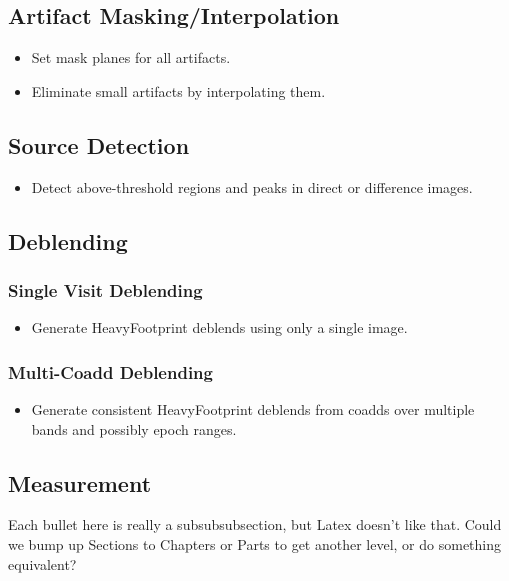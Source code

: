 \subsection{Artifact Masking/Interpolation}
\begin{itemize}
\item Set mask planes for all artifacts.
\item Eliminate small artifacts by interpolating them.
\end{itemize}

\subsection{Source Detection}
\begin{itemize}
\item Detect above-threshold regions and peaks in direct or difference images.
\end{itemize}

\subsection{Deblending}
\subsubsection{Single Visit Deblending}
\begin{itemize}
\item Generate HeavyFootprint deblends using only a single image.
\end{itemize}
\subsubsection{Multi-Coadd Deblending}
\begin{itemize}
\item Generate consistent HeavyFootprint deblends from coadds over multiple bands and possibly epoch ranges.
\end{itemize}

\subsection{Measurement}

\begin{note}[NOTE]
Each bullet here is really a subsubsubsection, but Latex doesn't like that.  Could we bump up Sections to Chapters or Parts to get another level, or do something equivalent?
\end{note}

